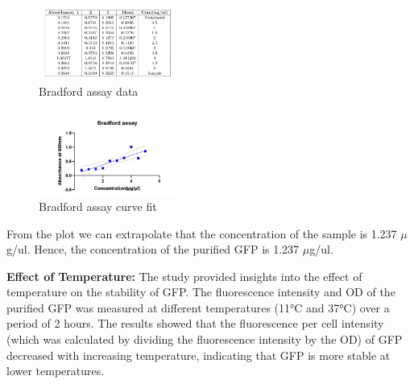 \documentclass[twoside]{article}
\begin{document}
\begin{multicols}{2}
\begin{figure}[H]
    \centering
    \includegraphics[width=0.4\textwidth]{Bradford table.jpg}
    \caption{Bradford assay data}
    \label{fig:Bradford_assay_data}
\end{figure}




\begin{figure}[H]
    \centering
    \includegraphics[width=0.4\textwidth]{Bradford plot.jpg}
    \caption{Bradford assay curve fit}
    \label{fig:Bradford_assay_plot}
\end{figure}

From the plot we can extrapolate that the concentration of the sample is 1.237 $\mu$g/ul.
Hence, the concentration of the purified GFP is 1.237 $\mu$g/ul.    

\textbf{Effect of Temperature:}
The study provided insights into the effect of temperature on the stability of GFP.
The fluorescence intensity and OD of the purified GFP was measured at different temperatures (11°C and 37°C) over a period of 2 hours.
The results showed that the fluorescence per cell intensity (which was calculated by dividing the fluorescence intensity by the OD)
of GFP decreased with increasing temperature, indicating that GFP is more stable at lower temperatures.


\end{multicols}
\end{document}

